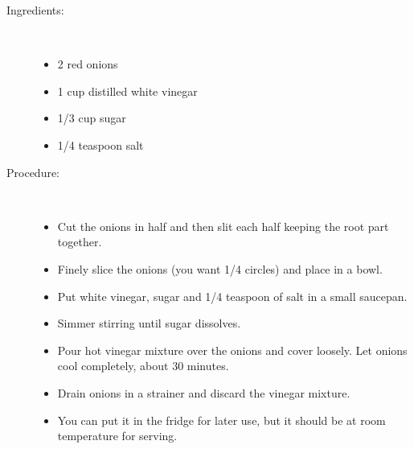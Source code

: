 \documentclass[11pt,letterpaper]{article}
\begin{document}


\begin{description}

\item[Ingredients:]\ \\
	\begin{itemize}
	\item 2 red onions
	\item 1 cup distilled white vinegar
	\item 1/3 cup sugar
	\item 1/4 teaspoon salt
	\end{itemize}

\item[Procedure:]\ \\
	\begin{itemize}
	\item Cut the onions in half and then slit each half keeping the root part together.
	\item Finely slice the onions (you want 1/4 circles) and place in a bowl.
	\item Put white vinegar, sugar and 1/4 teaspoon of salt  in a small saucepan.
	\item Simmer stirring until sugar dissolves.
	\item Pour hot vinegar mixture over the onions and cover loosely. Let onions cool completely, about 30 minutes.
	\item Drain onions in a strainer and discard the vinegar mixture.
	\item You can put it in the fridge for later use, but it should be at room temperature for serving.
	\end{itemize}
\end{description}
\end{document}
